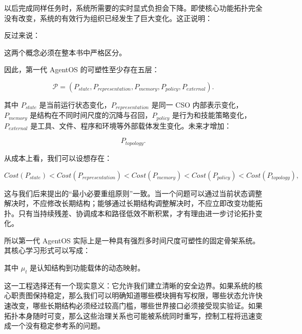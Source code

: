 以后完成同样任务时，系统所需要的实时显式负担会下降。即使核心功能拓扑完全没有改变，系统的有效行为组织已经发生了巨大变化。这正说明：

\begin{statementbox}
\centering
{}
\end{statementbox}

反过来说：

\begin{statementbox}
\centering
{}
\end{statementbox}

这两个概念必须在整本书中严格区分。

因此，第一代 AgentOS 的可塑性至少存在五层：

\[
\mathcal{P}
=
\left(
P_{state},
P_{representation},
P_{memory},
P_{policy},
P_{external}
\right).
\]

其中 $P_{state}$ 是当前运行状态变化，$P_{representation}$ 是同一 CSO 内部表示变化，$P_{memory}$ 是结构在不同时间尺度的沉降与召回，$P_{policy}$ 是行为和技能策略变化，$P_{external}$ 是工具、文件、程序和环境等外部载体发生变化。未来才增加：

\[
P_{topology}.
\]

从成本上看，我们可以设想存在：

\[
Cost(P_{state})
<
Cost(P_{representation})
<
Cost(P_{memory})
<
Cost(P_{policy})
<
Cost(P_{topology}),
\]

这与我们后来提出的“最小必要重组原则”一致。当一个问题可以通过当前状态调整解决时，不应修改长期结构；能够通过长期结构调整解决时，不应立即改变功能拓扑。只有当持续残差、协调成本和路径低效不断积累，才有理由进一步讨论拓扑变化。

所以第一代 AgentOS 实际上是一种具有强烈多时间尺度可塑性的固定骨架系统。其核心学习形式可以写成：

\begin{statementbox}
\centering
{}
\end{statementbox}

其中 $\mu_t$ 是认知结构到功能载体的动态映射。

这一工程选择还有一个现实意义：它允许我们建立清晰的安全边界。如果系统的核心职责图保持稳定，那么我们可以明确知道哪些模块拥有写权限，哪些状态允许快速改变，哪些长期结构必须经过较高门槛，哪些世界接口必须接受现实验证。如果拓扑本身随时可变，那么这些治理关系也可能被系统同时重写，控制工程将迅速变成一个没有稳定参考系的问题。

